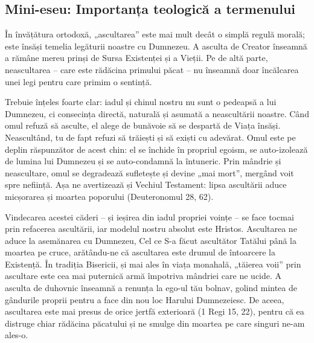 \subsection{Mini-eseu: Importanța teologică a termenului}

În învățătura ortodoxă, „ascultarea” este mai mult decât o simplă regulă morală; este însăși temelia legăturii noastre cu Dumnezeu. A asculta de Creator înseamnă a rămâne mereu prinși de Sursa Existenței și a Vieții. Pe de altă parte, neascultarea – care este rădăcina primului păcat – nu înseamnă doar încălcarea unei legi pentru care primim o sentință.

Trebuie înțeles foarte clar: iadul și chinul nostru nu sunt o pedeapsă a lui Dumnezeu, ci consecința directă, naturală și asumată a neascultării noastre. Când omul refuză să asculte, el alege de bunăvoie să se despartă de Viața însăși. Neascultând, tu de fapt refuzi să trăiești și să exiști cu adevărat. Omul este pe deplin răspunzător de acest chin: el se închide în propriul egoism, se auto-izolează de lumina lui Dumnezeu și se auto-condamnă la întuneric. Prin mândrie și neascultare, omul se degradează sufletește și devine „mai mort”, mergând voit spre neființă. Așa ne avertizează și Vechiul Testament: lipsa ascultării aduce micșorarea și moartea poporului (Deuteronomul 28, 62).

Vindecarea acestei căderi – și ieșirea din iadul propriei voințe – se face tocmai prin refacerea ascultării, iar modelul nostru absolut este Hristos. Ascultarea ne aduce la asemănarea cu Dumnezeu, Cel ce S-a făcut ascultător Tatălui până la moartea pe cruce, arătându-ne că ascultarea este drumul de întoarcere la Existență. În tradiția Bisericii, și mai ales în viața monahală, „tăierea voii” prin ascultare este cea mai puternică armă împotriva mândriei care ne ucide. A asculta de duhovnic înseamnă a renunța la ego-ul tău bolnav, golind mintea de gândurile proprii pentru a face din nou loc Harului Dumnezeiesc. De aceea, ascultarea este mai presus de orice jertfă exterioară (1 Regi 15, 22), pentru că ea distruge chiar rădăcina păcatului și ne smulge din moartea pe care singuri ne-am ales-o.